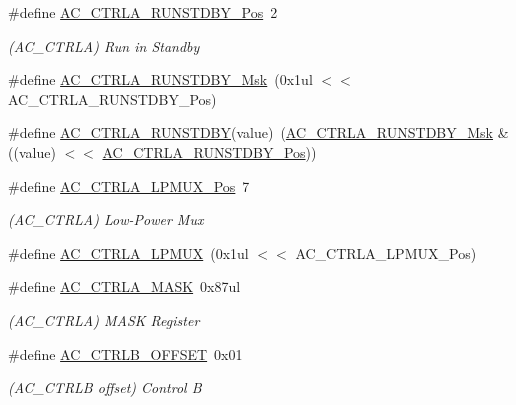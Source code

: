 \begin{DoxyCompactItemize}
\item 
\#define \mbox{\hyperlink{group___s_a_m_d21___a_c_ga635b7202eb47471e1d635e5c6bd31b62}{A\+C\+\_\+\+C\+T\+R\+L\+A\+\_\+\+R\+U\+N\+S\+T\+D\+B\+Y\+\_\+\+Pos}}~2
\begin{DoxyCompactList}\small\item\em (A\+C\+\_\+\+C\+T\+R\+LA) Run in Standby \end{DoxyCompactList}\item 
\#define \mbox{\hyperlink{group___s_a_m_d21___a_c_ga12a76d471bc11057b17818ccb8c61f9d}{A\+C\+\_\+\+C\+T\+R\+L\+A\+\_\+\+R\+U\+N\+S\+T\+D\+B\+Y\+\_\+\+Msk}}~(0x1ul $<$$<$ A\+C\+\_\+\+C\+T\+R\+L\+A\+\_\+\+R\+U\+N\+S\+T\+D\+B\+Y\+\_\+\+Pos)
\item 
\#define \mbox{\hyperlink{group___s_a_m_d21___a_c_ga837e8ebd7010b85f3ce5ce4a3ad013fc}{A\+C\+\_\+\+C\+T\+R\+L\+A\+\_\+\+R\+U\+N\+S\+T\+D\+BY}}(value)~(\mbox{\hyperlink{group___s_a_m_d21___a_c_ga12a76d471bc11057b17818ccb8c61f9d}{A\+C\+\_\+\+C\+T\+R\+L\+A\+\_\+\+R\+U\+N\+S\+T\+D\+B\+Y\+\_\+\+Msk}} \& ((value) $<$$<$ \mbox{\hyperlink{group___s_a_m_d21___a_c_ga635b7202eb47471e1d635e5c6bd31b62}{A\+C\+\_\+\+C\+T\+R\+L\+A\+\_\+\+R\+U\+N\+S\+T\+D\+B\+Y\+\_\+\+Pos}}))
\item 
\#define \mbox{\hyperlink{group___s_a_m_d21___a_c_ga42960cb6725acc8513dddb8a7fe49a58}{A\+C\+\_\+\+C\+T\+R\+L\+A\+\_\+\+L\+P\+M\+U\+X\+\_\+\+Pos}}~7
\begin{DoxyCompactList}\small\item\em (A\+C\+\_\+\+C\+T\+R\+LA) Low-\/\+Power Mux \end{DoxyCompactList}\item 
\#define \mbox{\hyperlink{group___s_a_m_d21___a_c_ga5f98ddaa185fda2009c809ce4b9ef308}{A\+C\+\_\+\+C\+T\+R\+L\+A\+\_\+\+L\+P\+M\+UX}}~(0x1ul $<$$<$ A\+C\+\_\+\+C\+T\+R\+L\+A\+\_\+\+L\+P\+M\+U\+X\+\_\+\+Pos)
\item 
\#define \mbox{\hyperlink{group___s_a_m_d21___a_c_ga9825c7ce5b1a6de685e38859c9cd282d}{A\+C\+\_\+\+C\+T\+R\+L\+A\+\_\+\+M\+A\+SK}}~0x87ul
\begin{DoxyCompactList}\small\item\em (A\+C\+\_\+\+C\+T\+R\+LA) M\+A\+SK Register \end{DoxyCompactList}\item 
\#define \mbox{\hyperlink{group___s_a_m_d21___a_c_ga63f35a95c3a9ef7fa1664630f3831991}{A\+C\+\_\+\+C\+T\+R\+L\+B\+\_\+\+O\+F\+F\+S\+ET}}~0x01
\begin{DoxyCompactList}\small\item\em (A\+C\+\_\+\+C\+T\+R\+LB offset) Control B \end{DoxyCompactList}\item 
$$
\end{DoxyCompactItemize}
